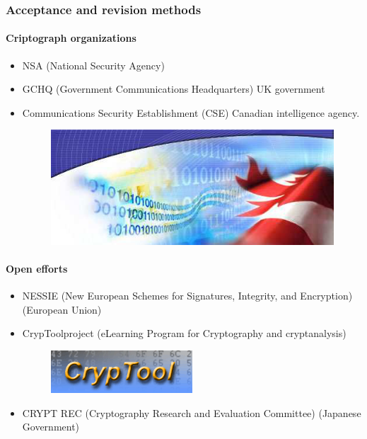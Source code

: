 \documentclass{beamer}
\begin{document}
\begin{frame}
\frametitle{Acceptance and revision methods}
\framesubtitle{Criptograph organizations}
\begin{itemize}
\item NSA (National Security Agency)
\item GCHQ (Government Communications Headquarters) UK government
\item Communications Security Establishment (CSE) Canadian intelligence agency.
\begin{figure}
\includegraphics[width=0.3\linewidth]{cse.png}
\end{figure}
\end{itemize}
\end{frame}

\begin{frame}
\framesubtitle{Open efforts}
\begin{itemize}
\item NESSIE (New European Schemes for Signatures, Integrity, and Encryption) (European Union)
\item CrypToolproject (eLearning Program for Cryptography and cryptanalysis)
\begin{figure}
\includegraphics[width=0.3\linewidth]{cryptool.png}
\end{figure}
\item CRYPT REC (Cryptography Research and Evaluation Committee) (Japanese Government)
\end{itemize}
\end{frame}

\end{document}
